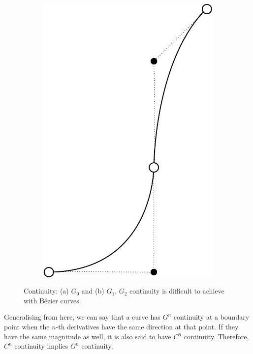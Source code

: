 \begin{figure}
\begin{subfigure}{0.3\linewidth}
\includegraphics[width=\linewidth]{figs/g1}
\caption{}%
\label{subfig:g1}
\end{subfigure}%
\caption{Continuity: (a) \(G_0\) and (b) \(G_1\). \(G_2\) continuity is difficult to achieve with B\'ezier curves.}%
\label{fig:g}
\end{figure}

Generalising from here, we can say that a curve has \(G^n\) continuity at a boundary point when the \(n\)-th derivatives have the same direction at that point.
If they have the same magnitude as well, it is also said to have \(C^n\) continuity.
Therefore, \(C^n\) continuity implies \(G^n\) continuity.

